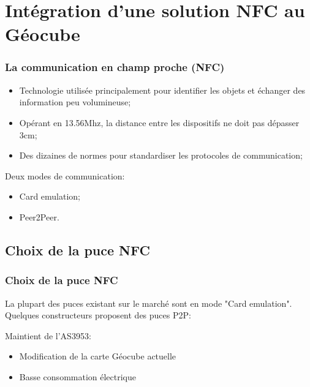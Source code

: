 \documentclass{beamer}
\begin{document}
\section{Intégration d'une solution NFC au Géocube}

\begin{frame}
\frametitle{La communication en champ proche (NFC)}
\begin{itemize}
\item Technologie utilisée principalement pour identifier les objets et échanger des information peu volumineuse;
\item Opérant en 13.56Mhz, la distance entre les dispositifs ne doit pas dépasser 3cm;
\item Des dizaines de normes pour standardiser les protocoles de communication;
\end{itemize}
Deux modes de communication:
\begin{itemize}
\item Card emulation;
\item Peer2Peer.
\end{itemize}
\end{frame}

\subsection{Choix de la puce NFC}
\begin{frame}
\frametitle{Choix de la puce NFC}
La plupart des puces existant sur le marché sont en mode "Card emulation". Quelques constructeurs proposent des puces P2P:

\begin{table}
\centering
{}
\end{table}

Maintient de l'AS3953:
\begin{itemize}
\item Modification de la carte Géocube actuelle
\item Basse consommation électrique
\end{itemize}

\end{frame}
\end{document}

